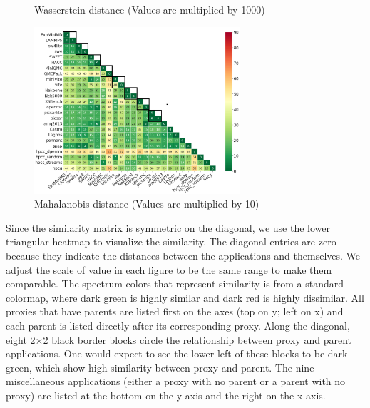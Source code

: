 \begin{figure}[htbp]
\begin{minipage}[t]{0.48\textwidth}
	\vspace*{-5mm}
	\caption{Wasserstein distance (Values are multiplied by 1000)}
	\label{figs:Wasserstein}
	\end{minipage}
\hspace{.1in}	
\begin{minipage}[t]{0.48\textwidth}
	\centering
	\includegraphics[width=3in]{figs/Mahalanobis distance_m10.png}
	\vspace*{-5mm}
	\caption{Mahalanobis distance (Values are multiplied by 10)}
	\label{figs:Mahalanobis}
	\end{minipage}
\hspace{.1in}
\end{figure}

Since the similarity matrix is symmetric on the diagonal, we use the lower triangular heatmap to visualize the similarity. The diagonal entries are zero because they indicate the distances between the applications and themselves. We adjust the scale of value in each figure to be the same range to make them comparable. The spectrum colors that represent similarity is from a standard colormap, where dark green is highly similar and dark red is highly dissimilar. All proxies that have parents are listed first on the axes (top on y; left on x) and each parent is listed directly after its corresponding proxy. Along the diagonal, eight 2$\times$2 black border blocks circle the relationship between proxy and parent applications. One would expect to see the lower left of these blocks to be dark green, which show high similarity between proxy and parent. The nine miscellaneous applications (either a proxy with no parent or a parent with no proxy) are listed at the bottom on the y-axis and the right on the x-axis. 

